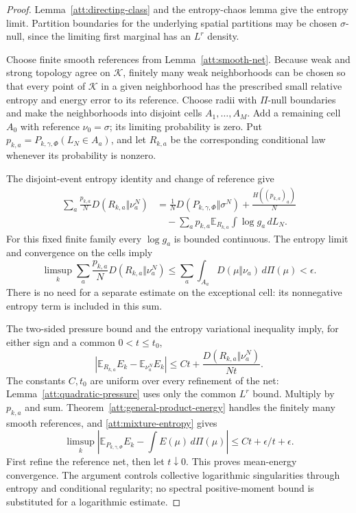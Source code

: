 \begin{proof}
Lemma~\ref{att:directing-class} and the entropy-chaos lemma give the
entropy limit. Partition boundaries for the underlying spatial
partitions may be chosen $\sigma$-null, since the limiting first
marginal has an $L^r$ density.

Choose finite smooth references from Lemma~\ref{att:smooth-net}.
Because weak and strong topology agree on $\mathcal K$, finitely many
weak neighborhoods can be chosen so that every point of
$\mathcal K$ in a given neighborhood has the prescribed small relative
entropy and energy error to its reference. Choose radii with
$\Pi$-null boundaries and make the neighborhoods into disjoint cells
$A_1,\ldots,A_M$. Add a remaining cell $A_0$ with reference
$\nu_0=\sigma$; its limiting probability is zero. Put
$p_{k,a}=P_{k,\gamma,\Phi}(L_N\in A_a)$, and let $R_{k,a}$ be the
corresponding conditional law whenever its probability is nonzero.

The disjoint-event entropy identity and change of reference give
\begin{align*}
 \sum_a\frac{p_{k,a}}N D(R_{k,a}\Vert\nu_a^N)
 &=\frac1N D(P_{k,\gamma,\Phi}\Vert\sigma^N)
   +\frac{H((p_{k,a})_a)}N\\
 &\quad-\sum_a p_{k,a}\mathbb E_{R_{k,a}}
                    \int\log g_a\,dL_N.
\end{align*}
For this fixed finite family every $\log g_a$ is bounded continuous.
The entropy limit and convergence on the cells imply
\begin{equation}
 \limsup_k\sum_a\frac{p_{k,a}}N
                D(R_{k,a}\Vert\nu_a^N)
 \le\sum_a\int_{A_a}D(\mu\Vert\nu_a)\,d\Pi(\mu)<\epsilon.
 \label{att:mixture-entropy}
\end{equation}
There is no need for a separate estimate on the exceptional cell:
its nonnegative entropy term is included in this sum.

The two-sided pressure bound and the entropy variational inequality
imply, for either sign and a common $0<t\le t_0$,
\[
 \left|\mathbb E_{R_{k,a}}E_k-
                   \mathbb E_{\nu_a^N}E_k\right|
 \le Ct+\frac{D(R_{k,a}\Vert\nu_a^N)}{Nt}.
\]
The constants $C,t_0$ are uniform over every refinement of the net:
Lemma~\ref{att:quadratic-pressure} uses only the common $L^r$ bound.
Multiply by $p_{k,a}$ and sum. Theorem~\ref{att:general-product-energy}
handles the finitely many smooth references, and
\eqref{att:mixture-entropy} gives
\[
 \limsup_k\left|\mathbb E_{P_{k,\gamma,\Phi}}E_k
                   -\int E(\mu)\,d\Pi(\mu)\right|
 \le Ct+\epsilon/t+\epsilon.
\]
First refine the reference net, then let $t\downarrow0$. This proves
mean-energy convergence. The argument controls collective logarithmic
singularities through entropy and conditional regularity; no spectral
positive-moment bound is substituted for a logarithmic estimate.
\end{proof}

